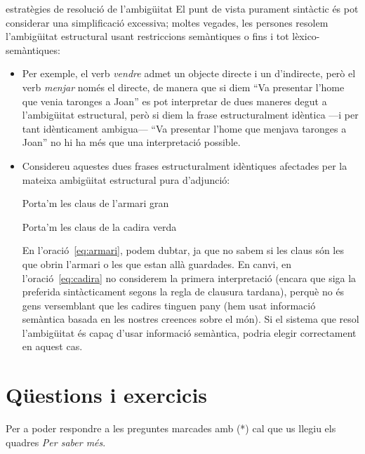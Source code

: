 \begin{persabermes}{estratègies de resolució de l'ambigüitat}
  El punt de vista purament sintàctic és pot considerar una
  simplificació excessiva; moltes vegades, les persones resolem
  l'ambigüitat estructural usant restriccions semàntiques o fins i tot
  lèxico-semàntiques:
  \begin{itemize}
  \item Per exemple, el verb \emph{vendre} admet un objecte directe i
    un d'indirecte, però el verb \emph{menjar} només el directe, de
    manera que si diem ``Va presentar l'home que venia taronges a
    Joan'' es pot interpretar de dues maneres degut a l'ambigüitat
    estructural, però si diem la frase estructuralment idèntica ---i
    per tant idènticament ambigua--- ``Va presentar l'home que menjava
    taronges a Joan'' no hi ha més que una interpretació possible.
  \item Considereu aquestes dues frases estructuralment idèntiques
    afectades per la mateixa ambigüitat estructural pura d'adjunció:
    \begin{exemple}
      \label{eq:armari}
      Porta'm les claus de l'armari gran
    \end{exemple}
    \begin{exemple}
      \label{eq:cadira}
      Porta'm les claus de la cadira verda
    \end{exemple}
    En l'oració~\ref{eq:armari}, podem dubtar, ja que no sabem si les
    claus són les que obrin l'armari o les que estan allà
    guardades. En canvi, en l'oració~\ref{eq:cadira} no considerem la
    primera interpretació (encara que siga la preferida sintàcticament
    segons la regla de clausura tardana), perquè no és gens
    versemblant que les cadires tinguen pany (hem usat informació
    semàntica basada en les nostres creences sobre el món). Si el
    sistema que resol l'ambigüitat és capaç d'usar informació
    semàntica, podria elegir correctament en aquest cas.
  \end{itemize}
\end{persabermes}

\section{Qüestions i exercicis}
Per a poder respondre a les preguntes marcades amb (*) cal que us
llegiu els quadres \emph{Per saber més}.

